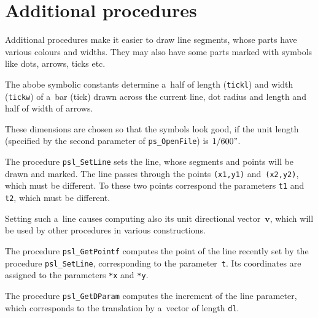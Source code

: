 \section{Additional procedures}

Additional procedures make it easier to draw line segments, whose parts
have various colours and widths. They may also have some parts marked
with symbols like dots, arrows, ticks etc.

\vspace{\bigskipamount}
\begin{sloppypar}
The abobe symbolic constants determine a~half of length (\texttt{tickl})
and width (\texttt{tickw}) of a~bar (tick) drawn across the current line,
dot radius and length and half of width of arrows.
\end{sloppypar}

These dimensions are chosen so that the symbols look good, if the unit length
(specified by the second parameter of \texttt{ps\_OpenFile}) is $1/600"$.

\vspace{\bigskipamount}
The procedure \texttt{psl\_SetLine} sets the line, whose segments and points
will be drawn and marked. The line passes through the points \texttt{(x1,y1)}
and~\texttt{(x2,y2)}, which must be different. To these two points
correspond the parameters \texttt{t1} and \texttt{t2}, which must be different.

Setting such a~line causes computing also its unit directional vector~$\bm{v}$,
which will be used by other procedures in various constructions.

\newpage
The procedure \texttt{psl\_GetPointf} computes the point of the line
recently set by the procedure \texttt{psl\_SetLine}, corresponding to
the parameter~\texttt{t}. Its coordinates are assigned to the
parameters \texttt{*x} and \texttt{*y}.

\vspace{\bigskipamount}
The procedure \texttt{psl\_GetDParam} computes the increment of the
line parameter, which corresponds to the translation by a~vector
of length \texttt{dl}.

